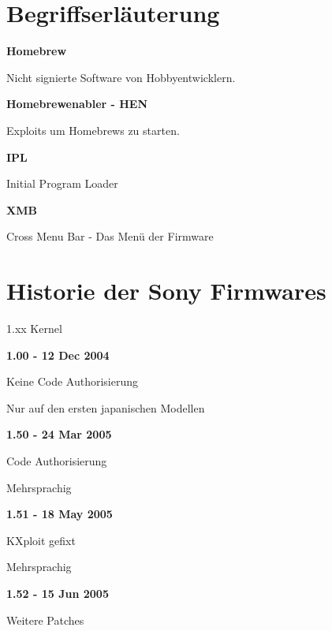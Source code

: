 \documentclass[mode=print,paper=screen,style=jefka]{powerdot}
\begin{document}
\section{Begriffserläuterung}
\begin{slide}{}
	\begin{large}\textbf{Homebrew}\end{large}\linebreak
	Nicht signierte Software von Hobbyentwicklern.\linebreak
	\linebreak
	\begin{large}\textbf{Homebrewenabler - HEN}\end{large}\linebreak
	Exploits um Homebrews zu starten.\linebreak
	\linebreak
	\begin{large}\textbf{IPL}\end{large}\linebreak
	Initial Program Loader\linebreak
	\linebreak
	\begin{large}\textbf{XMB}\end{large}\linebreak
	Cross Menu Bar - Das Menü der Firmware
\end{slide}



\section{Historie der Sony Firmwares}
\begin{slide}{1.xx Kernel}
	\begin{large}\textbf{1.00 - 12 Dec 2004}\end{large}
	\begin{list}{-}{}
		\item{Keine Code Authorisierung}
		\item{Nur auf den ersten japanischen Modellen}
	\end{list}
	\begin{large}\textbf{1.50 - 24 Mar 2005}\end{large}
	\begin{list}{-}{}
		\item{Code Authorisierung}
		\item{Mehrsprachig}
	\end{list}
	\begin{large}\textbf{1.51 - 18 May 2005}\end{large}
	\begin{list}{-}{}
		\item{KXploit gefixt}
		\item{Mehrsprachig}
	\end{list}
	\begin{large}\textbf{1.52 - 15 Jun 2005}\end{large}
	\begin{list}{-}{}
		\item{Weitere Patches}
	\end{list}
\end{slide}
\end{document}
